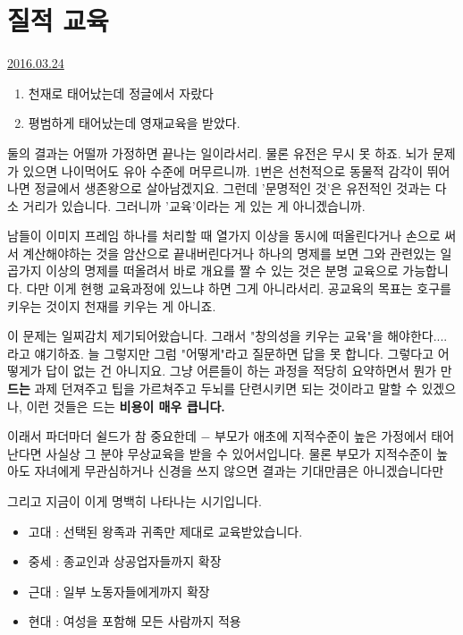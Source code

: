 \section{질적 교육}
\href{https://www.kockoc.com/Apoc/692503}{2016.03.24}

\vspace{5mm}
\begin{enumerate}
    \item  천재로 태어났는데 정글에서 자랐다
    \item  평범하게 태어났는데 영재교육을 받았다.
\end{enumerate}
\vspace{5mm}

둘의 결과는 어떨까 가정하면 끝나는 일이라서리.
물론 유전은 무시 못 하죠. 뇌가 문제가 있으면 나이먹어도 유아 수준에 머무르니까.
1번은 선천적으로 동물적 감각이 뛰어나면 정글에서 생존왕으로 살아남겠지요.
그런데 '문명적인 것'은 유전적인 것과는 다소 거리가 있습니다. 그러니까 '교육'이라는 게 있는 게 아니겠습니까.
\vspace{5mm}

남들이 이미지 프레임 하나를 처리할 때 열가지 이상을 동시에 떠올린다거나
손으로 써서 계산해야하는 것을 암산으로 끝내버린다거나
하나의 명제를 보면 그와 관련있는 일곱가지 이상의 명제를 떠올려서 바로 개요를 짤 수 있는 것은 분명  교육으로 가능합니다.
다만 이게 현행 교육과정에 있느냐 하면 그게 아니라서리.
공교육의 목표는 호구를 키우는 것이지 천재를 키우는 게 아니죠.
\vspace{5mm}

이 문제는 일찌감치 제기되어왔습니다. 그래서 "창의성을 키우는 교육"을 해야한다.... 라고 얘기하죠.
늘 그렇지만 그럼 "어떻게"라고 질문하면 답을 못 합니다.
그렇다고 어떻게가 답이 없는 건 아니지요. 그냥 어른들이 하는 과정을 적당히 요약하면서 뭔가 만\textbf{드는} 과제 던져주고
팁을 가르쳐주고 두뇌를 단련시키면 되는 것이라고 말할 수 있겠으나, 이런 것들은 드는 \textbf{비용이 매우 큽니다.}
\vspace{5mm}

이래서 파더마더 쉴드가 참 중요한데 $-$ 부모가 애초에 지적수준이 높은 가정에서 태어난다면
사실상 그 분야 무상교육을 받을 수 있어서입니다.
물론 부모가 지적수준이 높아도 자녀에게 무관심하거나 신경을 쓰지 않으면 결과는 기대만큼은 아니겠습니다만
\vspace{5mm}

그리고 지금이 이게 명백히 나타나는 시기입니다.
\vspace{5mm}
\begin{itemize}
    \item 고대 : 선택된 왕족과 귀족만 제대로 교육받았습니다.
    \item 중세 : 종교인과 상공업자들까지 확장
    \item 근대 : 일부 노동자들에게까지 확장
    \item 현대 : 여성을 포함해 모든 사람까지 적용
\end{itemize}
\vspace{5mm}

